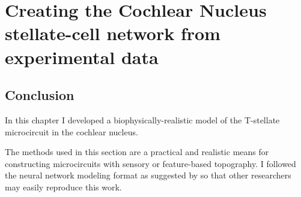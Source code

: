 \documentclass[11pt,a4paper,twoside]{book} %
\begin{document}

\setcounter{chapter}{2}
\chapter[Simple Responses]{Creating the Cochlear Nucleus stellate-cell network from experimental data}
\label{sec:SimpleResponsesChapter}



\newpage

\newpage

\newpage

\newpage
% 
\newpage


\section{Conclusion}

In this chapter I developed a biophysically-realistic model of the
T-stellate microcircuit in the cochlear nucleus.

\medskip{}

The methods used in this section are a practical and realistic means
for constructing microcircuits with sensory or feature-based
topography.  I followed the neural network modeling format as
suggested by \citet{NordlieGewaltigEtAl:2009} so that other
researchers may easily reproduce this work.


\appendix


 

\newpage
\listoftodos
\end{document}
